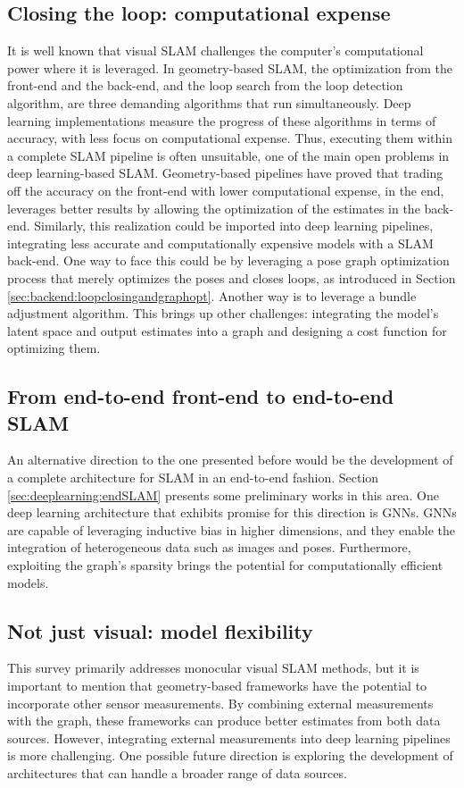 \subsection{Closing the loop: computational expense}
It is well known that visual SLAM challenges the computer's computational power where it is leveraged. In geometry-based SLAM, the optimization from the front-end and the back-end, and the loop search from the loop detection algorithm, are three demanding algorithms that run simultaneously.
Deep learning implementations measure the progress of these algorithms in terms of accuracy, with less focus on computational expense. Thus, executing them within a complete SLAM pipeline is often unsuitable, one of the main open problems in deep learning-based SLAM. Geometry-based pipelines have proved that trading off the accuracy on the front-end with lower computational expense, in the end, leverages better results by allowing the optimization of the estimates in the back-end. Similarly, this realization could be imported into deep learning pipelines, integrating less accurate and computationally expensive models with a SLAM back-end. One way to face this could be by leveraging a pose graph optimization process that merely optimizes the poses and closes loops, as introduced in Section \ref{sec:backend:loopclosingandgraphopt}. Another way is to leverage a bundle adjustment algorithm. This brings up other challenges: integrating the model's latent space and output estimates into a graph and designing a cost function for optimizing them.

\subsection{From end-to-end front-end to end-to-end SLAM}
An alternative direction to the one presented before would be the development of a complete architecture for SLAM in an end-to-end fashion. Section \ref{sec:deeplearning:endSLAM} presents some preliminary works in this area. One deep learning architecture that exhibits promise for this direction is \acp{GNN}. GNNs are capable of leveraging inductive bias in higher dimensions,  and they enable the integration of heterogeneous data such as images and poses. Furthermore, exploiting the graph's sparsity brings the potential for computationally efficient models.

\subsection{Not just visual: model flexibility}
This survey primarily addresses monocular visual SLAM methods, but it is important to mention that geometry-based frameworks have the potential to incorporate other sensor measurements. By combining external measurements with the graph, these frameworks can produce better estimates from both data sources. However, integrating external measurements into deep learning pipelines is more challenging. One possible future direction is exploring the development of architectures that can handle a broader range of data sources.


